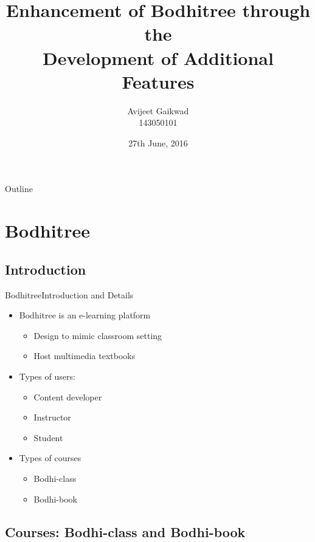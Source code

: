 \documentclass[xcolor=table]{beamer}
\title[Feature addition to Bodhitree]{Enhancement of Bodhitree through the \\ Development of Additional Features}
\author{Avijeet Gaikwad \\ 143050101}
\institute[] %
{  Guided by \\
	\vspace{0.1cm}
	{\small Prof. Kameswari Chebrolu} \\
	\vspace{0.5cm}
	Department of Computer Science and Engineering\\
	IIT Bombay
}
\date{27th June, 2016}
\begin{document}
\begin{frame}
  \titlepage
\end{frame}

\begin{frame}{Outline}
  \begin{multicols}{2}
    \tableofcontents
  \end{multicols}
\end{frame}

\section{Bodhitree}

\subsection{Introduction}

\begin{frame}{Bodhitree}{Introduction and Details}
  \begin{itemize}
  \item {
    Bodhitree is an e-learning platform
    \begin{itemize}
    	\item Design to mimic classroom setting
    	\item Host multimedia textbooks
    \end{itemize}
  }
  \item {
    Types of users:
    \begin{itemize}
    	\item Content developer
    	\item Instructor
    	\item Student
    \end{itemize}
  }
  \item {
  	Types of courses
	\begin{itemize}
		\item Bodhi-class
		\item Bodhi-book
	\end{itemize}
  }
\end{itemize}
\end{frame}

\subsection{Courses: Bodhi-class and Bodhi-book}
\end{document}
